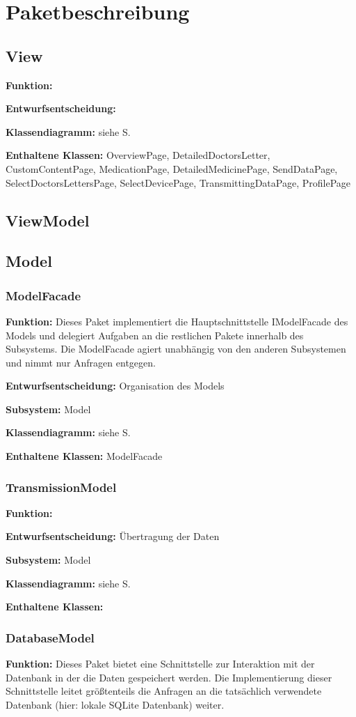 \documentclass[a4paper]{scrreprt}
\begin{document}
\section{Paketbeschreibung}
\subsection{View}
\textbf{Funktion:} %

\textbf{Entwurfsentscheidung:} %

\textbf{Klassendiagramm:} siehe S.

\textbf{Enthaltene Klassen:} OverviewPage, DetailedDoctorsLetter, CustomContentPage, MedicationPage, DetailedMedicinePage, SendDataPage, SelectDoctorsLettersPage, SelectDevicePage, TransmittingDataPage, ProfilePage
\subsection{ViewModel}
\subsection{Model}
\subsubsection{ModelFacade}
\textbf{Funktion:} Dieses Paket implementiert die Hauptschnittstelle IModelFacade des Models und delegiert Aufgaben an die restlichen Pakete innerhalb des Subsystems.
Die ModelFacade agiert unabhängig von den anderen Subsystemen und nimmt nur Anfragen entgegen.

\textbf{Entwurfsentscheidung:} Organisation des Models

\textbf{Subsystem:} Model

\textbf{Klassendiagramm:} siehe S.

\textbf{Enthaltene Klassen:} ModelFacade

\subsubsection{TransmissionModel}
\textbf{Funktion:}

\textbf{Entwurfsentscheidung:} Übertragung der Daten

\textbf{Subsystem:} Model

\textbf{Klassendiagramm:} siehe S.

\textbf{Enthaltene Klassen:} 

\subsubsection{DatabaseModel}
\textbf{Funktion:} Dieses Paket bietet eine Schnittstelle zur Interaktion mit der Datenbank in der die Daten gespeichert werden. 
Die Implementierung dieser Schnittstelle leitet größtenteils die Anfragen an die tatsächlich verwendete Datenbank (hier: lokale SQLite Datenbank) weiter.
\end{document}
